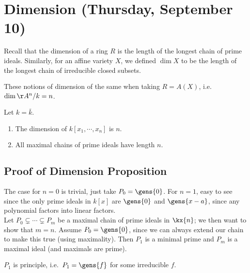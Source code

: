 \hypertarget{dimension-thursday-september-10}{%
\section{Dimension (Thursday, September
10)}\label{dimension-thursday-september-10}}

Recall that the dimension of a ring \(R\) is the length of the longest
chain of prime ideals. Similarly, for an affine variety \(X\), we
defined \(\dim X\) to be the length of the longest chain of irreducible
closed subsets.

These notions of dimension of the same when taking \(R = A(X)\),
i.e.~\(\dim \AA^n/k = n\).

\begin{proposition}[Dimensions]

Let \(k = \bar k\).

\begin{enumerate}
\def\labelenumi{\alph{enumi}.}
\tightlist
\item
  The dimension of \(k[x_1, \cdots, x_n]\) is \(n\).
\item
  All maximal chains of prime ideals have length \(n\).
\end{enumerate}

\end{proposition}

\hypertarget{proof-of-dimension-proposition}{%
\subsection{Proof of Dimension
Proposition}\label{proof-of-dimension-proposition}}

The case for \(n=0\) is trivial, just take \(P_0 = \gens{0}\). For
\(n=1\), easy to see since the only prime ideals in \(k[x]\) are
\(\gens{0}\) and \(\gens{x-a}\), since any polynomial factors into
linear factors.\\

Let \(P_0 \subsetneq \cdots \subsetneq P_m\) be a maximal chain of prime
ideals in \(\kx{n}\); we then want to show that \(m=n\). Assume
\(P_0 = \gens{0}\), since we can always extend our chain to make this
true (using maximality). Then \(P_1\) is a minimal prime and \(P_m\) is
a maximal ideal (and maximals are prime).

\begin{claim}

\(P_1\) is principle, i.e.~\(P_1 = \gens{f}\) for some irreducible
\(f\).

\end{claim}

